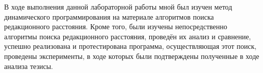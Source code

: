 \Conclusion

В ходе выполнения данной лабораторной работы мной был изучен метод динамического программирования на материале алгоритмов поиска редакционного расстояния. Кроме того, были изучены непосредственно алгоритмы поиска редакционного расстояния, проведён их анализ и сравнение, успешно реализована и протестирована программа, осуществляющая этот поиск, проведены эксперименты, в ходе которых были подтверждены полученные в ходе анализа тезисы.

